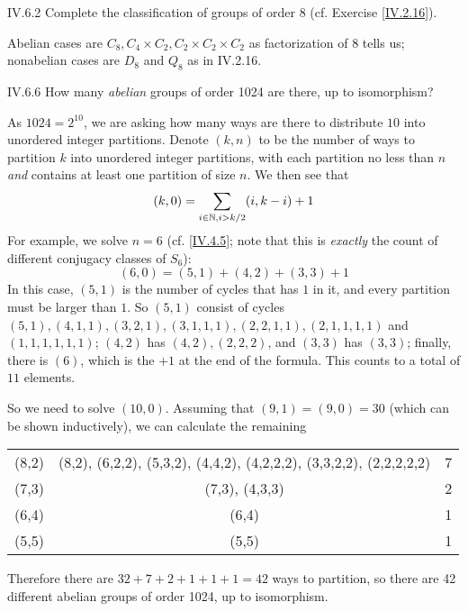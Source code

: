 \begin{problem}{IV.6.2}
Complete the classification of groups of order 8 (cf. Exercise \ref{IV.2.16}).
\end{problem}
\begin{solution}
Abelian cases are $C_8, C_4 \times C_2, C_2 \times C_2 \times C_2$ as factorization of $8$ tells us; nonabelian cases are $D_8$ and $Q_8$ as in IV.2.16.
\end{solution}

\begin{problem}{IV.6.6}
How many \emph{abelian} groups of order 1024 are there, up to isomorphism?
\end{problem}
\begin{solution}
As $1024 = 2^{10}$, we are asking how many ways are there to distribute $10$ into unordered integer partitions. Denote $(k,n)$ to be the number of ways to partition $k$ into unordered integer partitions, with each partition no less than $n$ \emph{and} contains at least one partition of size $n$. We then see that 
\[
(k,0) = \sum_{i \in \mathbb{N}, i > k/2} (i,k-i) + 1
\]
For example, we solve $n=6$ (cf. \ref{IV.4.5}; note that this is \emph{exactly} the count of different conjugacy classes of $S_6$):
\[
(6,0) = (5,1)+(4,2)+(3,3)+1
\]
In this case, $(5,1)$ is the number of cycles that has $1$ in it, and every partition must be larger than $1$. So $(5,1)$ consist of cycles $(5,1),(4,1,1),(3,2,1),(3,1,1,1),(2,2,1,1),(2,1,1,1,1)$ and $(1,1,1,1,1,1)$; $(4,2)$ has $(4,2),(2,2,2)$, and $(3,3)$ has $(3,3)$; finally, there is $(6)$, which is the $+1$ at the end of the formula. This counts to a total of $11$ elements.

So we need to solve $(10,0)$. Assuming that $(9,1) = (9,0) = 30$ (which can be shown inductively), we can calculate the remaining
\begin{center}
\begin{tabular}{c|c|c}
(8,2) &(8,2), (6,2,2), (5,3,2), (4,4,2), (4,2,2,2), (3,3,2,2), (2,2,2,2,2) &7 \\
(7,3) &(7,3), (4,3,3) &2\\
(6,4) &(6,4) &1\\
(5,5) &(5,5) &1\\
\end{tabular}	
\end{center}
Therefore there are $32+7+2+1+1+1 = 42$ ways to partition, so there are 42 different abelian groups of order 1024, up to isomorphism.
\end{solution}